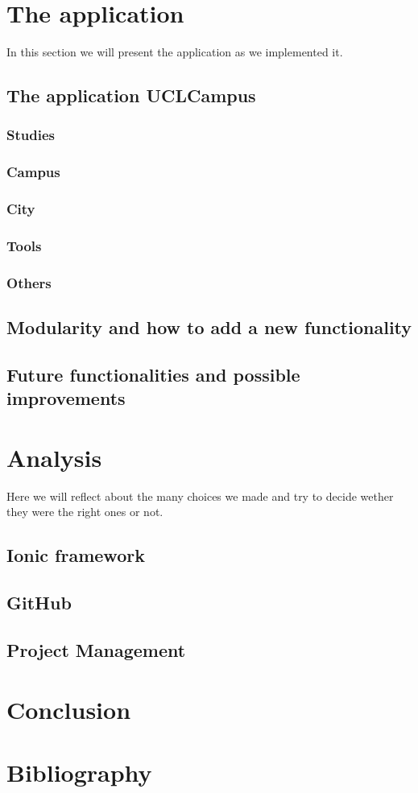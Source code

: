 \documentclass[11pt, a4paper]{report}
\begin{document}
\newpage

\chapter{The application}

In this section we will present the application as we implemented it.

\section{The application UCLCampus}

\subsection{Studies}

\subsection{Campus}

\subsection{City}

\subsection{Tools}

\subsection{Others}


\section{Modularity and how to add a new functionality}


\section{Future functionalities and possible improvements}

\chapter{Analysis}

Here we will reflect about the many choices we made and try to decide wether they were the right ones or not.

\section{Ionic framework}

\section{GitHub}

\section{Project Management}


\chapter{Conclusion} 

\chapter{Bibliography}
\end{document}
